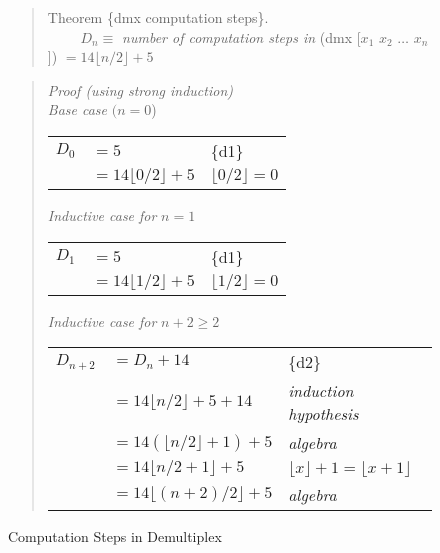 \begin{figure}
\begin{quote}
Theorem \{dmx computation steps\}. \\
~~~~ $D_n \equiv$ \emph{number of computation steps in} (dmx [$x_1$ $x_2$ $\dots$ $x_n$]) $= 14\lfloor n/2\rfloor + 5$
\end{quote}
\begin{quote}
\emph{Proof (using strong induction)} \\
\emph{Base case} $(n=0$) \\
\begin{tabular}{lll}
$D_{0}$&$= 5$                        & \{d1\} \\
       &$= 14\lfloor 0/2\rfloor + 5$ & $\lfloor 0/2\rfloor=0$ \\
\end{tabular}

\emph{Inductive case for} $n=1$\\
\begin{tabular}{lll}
$D_{1}$&$= 5$                        & \{d1\} \\
       &$= 14\lfloor 1/2\rfloor + 5$ & $\lfloor 1/2\rfloor=0$ \\
\end{tabular}

\emph{Inductive case for} $n+2 \geq 2$\\
\begin{tabular}{lll}
$D_{n+2}$ &$= D_n + 14$                      & \{d2\} \\
          &$= 14\lfloor n/2\rfloor + 5 + 14$ & \emph{induction hypothesis} \\
          &$= 14(\lfloor n/2\rfloor + 1) + 5$& \emph{algebra} \\
          &$= 14\lfloor n/2 + 1\rfloor + 5$  & $\lfloor x\rfloor + 1 = \lfloor x+1\rfloor$ \\
          &$= 14\lfloor(n+2)/2\rfloor + 5$   & \emph{algebra} \\
\end{tabular}
\end{quote}
\caption{Computation Steps in Demultiplex}
\label{fig:dmx-computation-time}
\end{figure}

